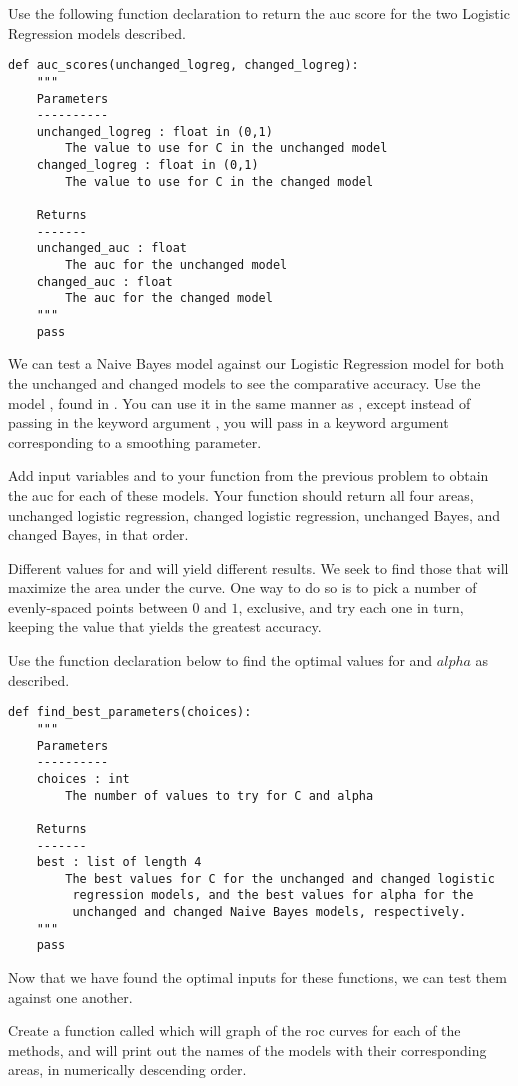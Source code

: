 \begin{problem}
Use the following function declaration to return the auc score for the two Logistic Regression models described.
\begin{lstlisting}
def auc_scores(unchanged_logreg, changed_logreg):
    """
    Parameters
    ----------
    unchanged_logreg : float in (0,1)
        The value to use for C in the unchanged model
    changed_logreg : float in (0,1)
        The value to use for C in the changed model

    Returns
    -------
    unchanged_auc : float
        The auc for the unchanged model
    changed_auc : float
        The auc for the changed model
    """
    pass
\end{lstlisting}
\end{problem}

We can test a Naive Bayes model against our Logistic Regression model for both the unchanged and changed models to see the comparative accuracy.  Use the model , found in .  You can use it in the same manner as , except instead of passing in the keyword argument , you will pass in a keyword argument  corresponding to a smoothing parameter.
\begin{problem}
Add input variables  and  to your function from the previous problem to obtain the auc for each of these models.  Your function should return all four areas, unchanged logistic regression, changed logistic regression, unchanged Bayes, and changed Bayes, in that order.
\end{problem}

Different values for  and  will yield different results.  We seek to find those that will maximize the area under the curve.  One way to do so is to pick a number of evenly-spaced points between $0$ and $1$, exclusive, and try each one in turn, keeping the value that yields the greatest accuracy.
\begin{problem}
Use the function declaration below to find the optimal values for  and $alpha$ as described.
\begin{lstlisting}
def find_best_parameters(choices):
    """
    Parameters
    ----------
    choices : int
        The number of values to try for C and alpha

    Returns
    -------
    best : list of length 4
        The best values for C for the unchanged and changed logistic
         regression models, and the best values for alpha for the
         unchanged and changed Naive Bayes models, respectively.
    """
    pass
\end{lstlisting}
\end{problem}

Now that we have found the optimal inputs for these functions, we can test them against one another.
\begin{problem}
Create a function called  which will graph of the roc curves for each of the methods, and will print out the names of the models with their corresponding areas, in numerically descending order.
\end{problem}
